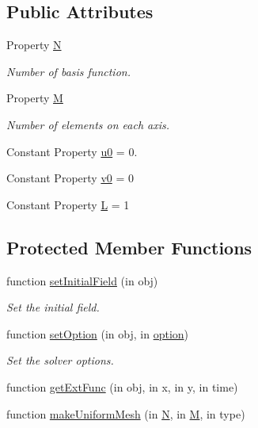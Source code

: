 \subsection*{Public Attributes}
\begin{DoxyCompactItemize}
\item 
Property \hyperlink{class_const_adv_sin_uniform_mesh2d_a75be19fb7212fe9031309e33dd562d5d}{N}
\begin{DoxyCompactList}\small\item\em Number of basis function. \end{DoxyCompactList}\item 
Property \hyperlink{class_const_adv_sin_uniform_mesh2d_a5caaf348aeb9a7a3aa4e2741bca66516}{M}
\begin{DoxyCompactList}\small\item\em Number of elements on each axis. \end{DoxyCompactList}\item 
Constant Property \hyperlink{class_const_adv_sin_uniform_mesh2d_add3a325898284dc67e19e4a07219e869}{u0} = 0.
\item 
Constant Property \hyperlink{class_const_adv_sin_uniform_mesh2d_a17bbf96228465fc10f94c4ca88bb8625}{v0} = 0
\item 
Constant Property \hyperlink{class_const_adv_sin_uniform_mesh2d_af2a6e4257bef81e2ef5c6771877410e6}{L} = 1
\end{DoxyCompactItemize}
\subsection*{Protected Member Functions}
\begin{DoxyCompactItemize}
\item 
function \hyperlink{class_const_adv_sin_uniform_mesh2d_a314901efd5d93e25d42aaed7932ecfb4}{set\+Initial\+Field} (in obj)
\begin{DoxyCompactList}\small\item\em Set the initial field. \end{DoxyCompactList}\item 
function \hyperlink{class_const_adv_sin_uniform_mesh2d_ab4c84136c3376ec58c6397da463ddde9}{set\+Option} (in obj, in \hyperlink{class_ndg_phys_af91f4c54b93504e76b38a5693774dff1}{option})
\begin{DoxyCompactList}\small\item\em Set the solver options. \end{DoxyCompactList}\item 
function \hyperlink{class_const_adv_sin_uniform_mesh2d_ab47bdeb4df157089871ecbc9ef14cd53}{get\+Ext\+Func} (in obj, in x, in y, in time)
\item 
function \hyperlink{class_const_adv_sin_uniform_mesh2d_a998be7bbfbf1e7d0fbfb419df1b8f540}{make\+Uniform\+Mesh} (in \hyperlink{class_const_adv_sin_uniform_mesh2d_a75be19fb7212fe9031309e33dd562d5d}{N}, in \hyperlink{class_const_adv_sin_uniform_mesh2d_a5caaf348aeb9a7a3aa4e2741bca66516}{M}, in type)
\end{DoxyCompactItemize}
